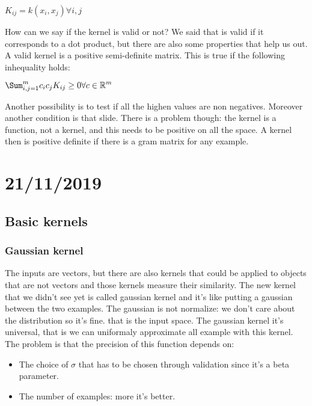 \begin{center}
	$\displaystyle K_{ij}=k(x_i, x_j)\forall i, j$
\end{center}
How can we say if the kernel is valid or not? We said that is valid if it corresponds to a dot product, but there are also some properties that help us out. A valid kernel is a positive semi-definite matrix. This is true if the following inhequality holds: 
\begin{center}
	$\displaystyle \Sum_{i,j=1}^m c_ic_jK_{ij}\geq 0 \forall c\in\mathbb{R}^m$
\end{center}
Another possibility is to test if all the highen values are non negatives. \newline
Moreover another condition is that slide. \newline
There is a problem though: the kernel is a function, not a kernel, and this needs to be positive on all the space. A kernel then is positive definite if there is a gram matrix for any example.

\chapter{21/11/2019}
\section{Basic kernels}
\subsection{Gaussian kernel}
The inputs are vectors, but there are also kernels that could be applied to objects that are not vectors and those kernels measure their similarity. \newline
The new kernel that we didn't see yet is called gaussian kernel and it's like putting a gaussian between the two examples. The gaussian is not normalize: we don't care about the distribution so it's fine. \newline
{} that is the input space.\newline
The gaussian kernel it's universal, that is we can uniformaly approximate all example with this kernel. The problem is that the precision of this function depends on:
\begin{itemize}
	\item The choice of $\sigma$ that has to be chosen through validation since it's a beta parameter. 
	\item The number of examples: more it's better. 
\end{itemize}
